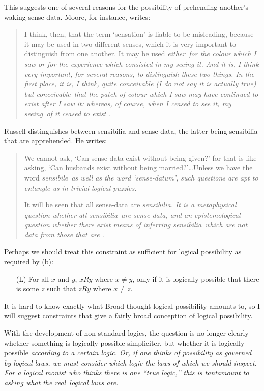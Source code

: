 This suggests one of several reasons for the possibility of prehending another's waking sense-data. Moore, for instance, writes:

\begin{quote}
I think, then, that the term `sensation' is liable to be misleading, because it may be used in two different senses, which it is very important to distinguish from one another. It may be used \em either\em\ for the colour which I saw or for the experience which consisted in my seeing it. And it is, I think very important, for several reasons, to distinguish these two things. In the first place, it is, I think, quite conceivable (I do not say it is actually true) but \em conceivable\em\ that the patch of colour which I saw may have continued to exist after I saw it: whereas, of course, when I ceased to see it, \em my seeing\em\ of it ceased to exist \citeyear[p. 31]{Moore:1953}.
\end{quote}
Russell distinguishes between sensibilia and sense-data, the latter being sensibilia that are apprehended. He writes:

\begin{quote}
We cannot ask, `Can sense-data exist without being given?' for that is like asking, `Can husbands exist without being married?'\dots Unless we have the word \em sensibile\em\ as well as the word `sense-datum', such questions are apt to entangle us in trivial logical puzzles.

It will be seen that all sense-data are \em sensibilia\em. It is a metaphysical question whether all \em sensibilia\em\ are sense-data, and an epistemological question whether there exist means of inferring \em sensibilia\em\ which are not data from those that are \cite[pp. 110-11]{Russell:1917}.
\end{quote}
Perhaps we should treat this constraint as sufficient for logical possibility as required by (b):
\begin{enumerate}

\item[(L)]For all $x$ and $y$, $xRy$ where $x\neq y$, only if it is logically possible that there is some $z$ such that $zRy$ where $x\neq z$.

\end{enumerate}
It is hard to know exactly what Broad thought logical possibility amounts to, so I will suggest constraints that give a fairly broad conception of logical possibility.

With the development of non-standard logics, the question is no longer clearly whether something is logically possible simpliciter, but whether it is logically possible \em according to a certain logic\em. Or, if one thinks of possibility as governed by logical \em laws\em, we must consider which logic the laws of which we should inspect. For a logical monist who thinks there is one ``true logic,'' this is tantamount to asking what the \em real\em\ logical laws are.

